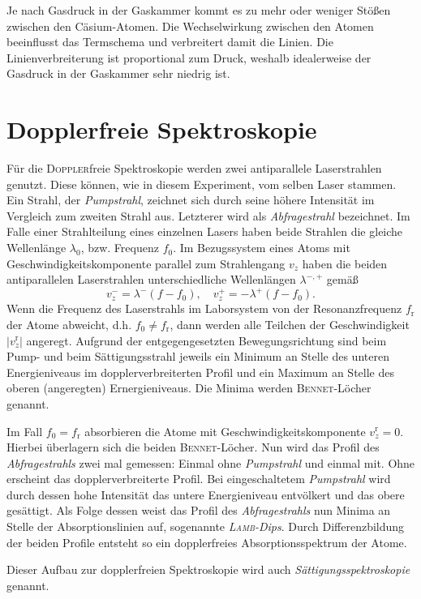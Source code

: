 \documentclass[../bericht.tex]{subfiles}
\begin{document}
        Je nach Gasdruck in der Gaskammer kommt es zu mehr oder weniger Stö{\ss}en zwischen den Cäsium-Atomen. Die Wechselwirkung zwischen den Atomen beeinflusst das Termschema und verbreitert damit die Linien. Die Linienverbreiterung ist proportional zum Druck, weshalb idealerweise der Gasdruck in der Gaskammer sehr niedrig ist.


    \section{Dopplerfreie Spektroskopie}

      Für die \textsc{Doppler}freie Spektroskopie werden zwei antiparallele Laserstrahlen genutzt. Diese können, wie in diesem Experiment, vom selben Laser stammen. Ein Strahl, der \textit{Pumpstrahl}, zeichnet sich durch seine höhere Intensität im Vergleich zum zweiten Strahl aus. Letzterer wird als \textit{Abfragestrahl} bezeichnet.
      Im Falle einer Strahlteilung eines einzelnen Lasers haben beide Strahlen die gleiche Wellenlänge $\lambda_0$, bzw. Frequenz $f_0$. Im Bezugssystem eines Atoms mit Geschwindigkeitskomponente parallel zum Strahlengang $v_z$ haben die beiden antiparallelen Laserstrahlen unterschiedliche Wellenlängen $\lambda ^{-,+}$ gemä\ss
      \begin{equation*}
        v_z^-=\lambda^- (f-f_0),\quad v_z^+=-\lambda^+ (f-f_0).
      \end{equation*}
      \medskip
      Wenn die Frequenz des Laserstrahls im Laborsystem von der Resonanzfrequenz $f_\mathrm{r}$ der Atome abweicht, d.h. $f_0\ne f_\mathrm{r}$, dann werden alle Teilchen der Geschwindigkeit $|v_z^\mathrm{r}|$ angeregt. Aufgrund der entgegengesetzten Bewegungsrichtung sind beim Pump- und beim Sättigungsstrahl jeweils ein Minimum an Stelle des unteren Energieniveaus im dopplerverbreiterten Profil und ein Maximum an Stelle des oberen (angeregten) Ernergieniveaus. Die Minima werden \textsc{Bennet}-Löcher genannt.
      \medskip

      Im Fall $f_0 = f_\mathrm{r}$ absorbieren die Atome mit Geschwindigkeitskomponente $v_z^\mathrm{r} = 0$. Hierbei überlagern sich die beiden \textsc{Bennet}-Löcher. Nun wird das Profil des \textit{Abfragestrahls} zwei mal gemessen: Einmal ohne \textit{Pumpstrahl} und einmal mit. Ohne erscheint das dopplerverbreiterte Profil. Bei eingeschaltetem \textit{Pumpstrahl} wird durch dessen hohe Intensität das untere Energieniveau entvölkert und das obere gesättigt. Als Folge dessen weist das Profil des \textit{Abfragestrahls} nun Minima an Stelle der Absorptionslinien auf, sogenannte \textit{\textsc{Lamb}-Dips}. Durch Differenzbildung der beiden Profile entsteht so ein dopplerfreies Absorptionsspektrum der Atome.

      Dieser Aufbau zur dopplerfreien Spektroskopie wird auch \textit{Sättigungsspektroskopie} genannt.
\end{document}
